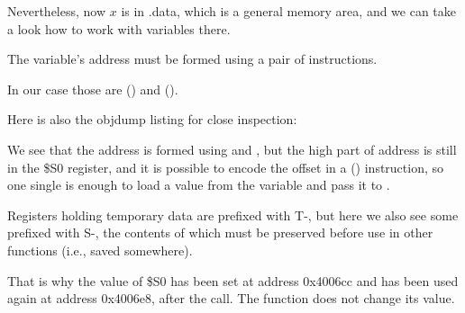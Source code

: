 Nevertheless, now $x$ is in .data, which is a general memory area, and we can take a look
how to work with variables there.


The variable's address must be formed using a pair of instructions.

In our case those are  () and  ().

Here is also the objdump listing for close inspection:




We see that the address is formed using  and , but the high part of address is still in
the \$S0 register, and it is possible to encode the offset in a  () instruction, so one single  is enough 
to load a value from the variable and pass it to \printf.

Registers holding temporary data are prefixed with T-, but here we also see some prefixed with S-, 
the contents of which must be preserved before use in other functions (i.e., saved somewhere).

That is why the value of \$S0 has been set at address 0x4006cc and has been used again
at address 0x4006e8, after the \scanf call. 
The \scanf function does not change its value.

